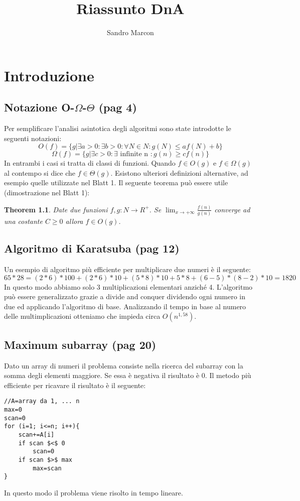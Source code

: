 \documentclass[a4paper]{book}
\author{Sandro Marcon}
\title{Riassunto DnA}
\begin{document}
\chapter{Introduzione}
\section{Notazione O-$\Omega$-$\Theta$ (pag 4)}
Per semplificare l'analisi asintotica degli algoritmi sono state introdotte le 
seguenti notazioni:
$$O(f)=\{ g|\exists a>0: \exists b>0: \forall N \in N : g(N)\leq af(N)+b \}$$
$$\Omega (f)=\{ g|\exists c>0: \exists \mbox{ infinite n } : g(n) \geq cf(n) \}$$
In entrambi i casi si tratta di classi di funzioni. Quando $f \in O(g)$ e $f \in \Omega (g)$ al contempo si dice che $f \in \Theta (g)$. Esistono ulteriori definizioni alternative, ad esempio quelle utilizzate nel Blatt 1. Il seguente teorema può essere utile (dimostrazione nel Blatt 1):
\newtheorem{theorem}{Theorem}
\begin{theorem}
Date due funzioni $ f,g: N \rightarrow R^{+} $. Se $ \lim_{x \rightarrow +\infty} \frac{f(n)}{g(n)} $ converge ad una costante $C\geq 0$ allora $f \in O(g)$.
\end{theorem}
\section{Algoritmo di Karatsuba (pag 12)}
Un esempio di algoritmo più efficiente per multiplicare due numeri è il seguente:
$$65 * 28 = (2 * 6) * 100 + (2 * 6) * 10 + (5 * 8) * 10 + 5 * 8 + (6-5)*(8-2) * 10 = 1820 $$
In questo modo abbiamo solo 3 multiplicazioni elementari anziché 4. L'algoritmo può essere generalizzato grazie a divide and conquer dividendo ogni numero in due ed applicando l'algoritmo di base. Analizzando il tempo in base al numero delle multimplicazioni otteniamo che impieda circa $O(n^{1,58})$.
\section{Maximum subarray (pag 20)}
Dato un array di numeri il problema consiste nella ricerca del subarray con la somma degli elementi maggiore. Se essa è negativa il risultato è 0. Il metodo più efficiente per ricavare il risultato è il seguente:
\begin{lstlisting}
//A=array da 1, ... n	
max=0	
scan=0
for (i=1; i<=n; i++){	
	scan+=A[i]
	if scan $<$ 0
		scan=0
	if scan $>$ max 
		max=scan
}			
\end{lstlisting}
In questo modo il problema viene risolto in tempo lineare.	
\end{document}
